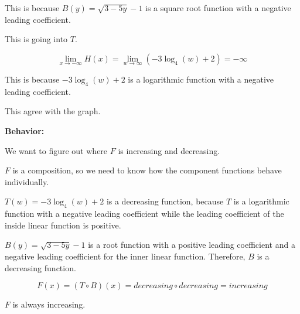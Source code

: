 \documentclass{ximera}
\begin{document}
This is because $B(y) = \sqrt{3 - 5y} - 1$ is a square root function with a negative leading coefficient. 


This is going into $T$. 



\[
\lim\limits_{x \to -\infty} H(x)  = \lim\limits_{w \to \infty} (-3 \log_4(w) + 2)  = -\infty
\]


This is because $-3 \log_4(w) + 2$ is a logarithmic function with a negative leading coefficient. 




This agree with the graph.  
























\textbf{\textcolor{blue!55!black}{Behavior:}}


We want to figure out where $F$ is increasing and decreasing. 

$F$ is a composition, so we need to know how the component functions behave individually. 





$T(w) = -3 \log_4(w) + 2$ is a decreasing function, because $T$ is a logarithmic function with a negative leading coefficient while the leading coefficient of the inside linear function is  positive. 

$B(y) = \sqrt{3 - 5y} - 1$ is a root function with a positive leading coefficient and a negative leading coefficient for the inner linear function.  Therefore, $B$ is a decreasing function.





\[
F(x) = (T \circ B)(x) = decreasing \circ decreasing = increasing
\]



$F$ is always increasing. 
\end{document}
